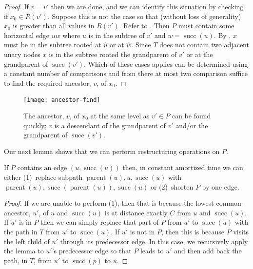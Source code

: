\documentclass{patmorin}
\DeclareMathOperator{\scc}{succ}
\DeclareMathOperator{\prnt}{parent}
\let\oldmarginpar\marginpar
\renewcommand{\marginpar}[2][rectangle,draw,fill=yellow,rounded corners,text width=2.21cm]{%
        \oldmarginpar{%
        \tikz \node at (0,0) [#1]{#2};}%
        }
\newcommand{\note}[1]{\marginpar{\raggedright\footnotesize\nohyphens{#1}}}
\begin{document}
\begin{proof}
  If $v=v'$ then we are done, and we can identify this situation by
  checking if $x_0\in R(v')$.  Suppose this is not the case so that
  (without loss of generality) $x_0$ is greater than all values in
  $R(v')$.  Refer to .  Then $P$ must contain
  some horizontal edge $uw$ where $u$ is in the subtree of $v'$ and
  $w=\scc(u)$.  By , $x$ must be in the subtree rooted at
  $\hat u$ or at $\hat w$. Since $T$ does not contain two adjacent unary
  nodes \note{check this} $x$ is in the subtree rooted the grandparent
  of $v'$ or at the grandparent of $\scc(v')$.  Which of these cases
  applies can be determined using a constant number of comparisons and
  from there at most two comparison suffice to find the required ancestor,
  $v$, of $x_0$.
\end{proof}

\begin{figure}
  \begin{center}
    \texttt{[image: ancestor-find]}
  \end{center}
  \caption{The ancestor, $v$, of $x_0$ at the same level as $v'\in P$
    can be found quickly; $v$ is a descendant of the grandparent of $v'$
    and/or the grandparent of $\scc(v')$.}
\end{figure}

Our next lemma shows that we can perform restructuring operations on $P$.

\begin{lem}
   If $P$ contains an edge $(u,\scc(u))$ then, in constant amortized
   time we can either (1)~replace subpath $\prnt(u),u,\scc(u)$ with
   $\prnt(u),\scc(\prnt(u)),\scc(u)$ or (2)~shorten $P$ by one edge.
\end{lem}

\begin{proof}
  If we are unable to perform (1), then that is because the
  lowest-common-ancestor, $u'$, of $u$ and $\scc(u)$ is at distance
  exactly $C$ from $u$ and $\scc(u)$.  If $u'$ is in $P$ then we can
  simply replace that part of $P$ from $u'$ to $\scc(u)$ with the path
  in $T$ from $u'$ to $\scc(u)$.  If $u'$ is not in $P$, then this is
  because $P$ visits the left child of $u'$ through its predecessor edge.
  In this case, we recursively apply the lemma to $u'$'s predecessor
  edge so that $P$ leads to $u'$ and then add back the path, in $T$,
  from $u'$ to $\scc(p)$ to $u$.
\end{proof}
\end{document}
